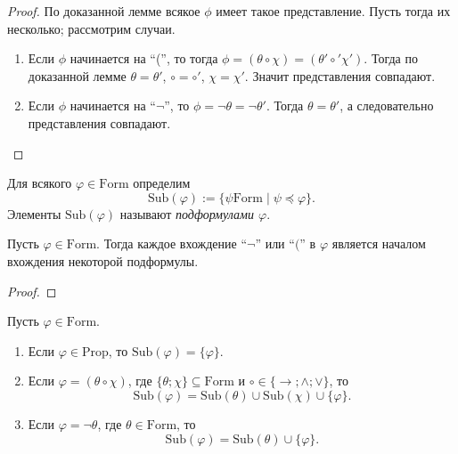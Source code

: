\documentclass[12pt,a4paper]{article}
\newcommand{\Prop}{\ensuremath{\mathrm{Prop}}\xspace}
\newcommand{\Formul}{\ensuremath{\mathrm{Form}}\xspace}
\newcommand{\Sub}{\ensuremath{\mathrm{Sub}}\xspace}
\begin{document}
    \begin{proof}
        По доказанной лемме всякое $\phi$ имеет такое представление. Пусть тогда их несколько; рассмотрим случаи.
        \begin{enumerate}
            \item Если $\phi$ начинается на ``('', то тогда $\phi = (\theta \circ \chi) = (\theta' \circ' \chi')$. Тогда по доказанной лемме $\theta = \theta'$, $\circ = \circ'$, $\chi = \chi'$. Значит представления совпадают.
            \item Если $\phi$ начинается на ``$\neg$'', то $\phi = \neg \theta = \neg \theta'$. Тогда $\theta = \theta'$, а следовательно представления совпадают.
        \end{enumerate}
    \end{proof}

    \begin{definition}
        Для всякого $\varphi \in \Formul$ определим
        \[\Sub(\varphi) := \{\psi \Formul \mid \psi \preccurlyeq \varphi\}.\]
        Элементы $\Sub(\varphi)$ называют \emph{подформулами $\varphi$}.
    \end{definition}

    \begin{lemma}
        Пусть $\varphi \in \Formul$. Тогда каждое вхождение ``$\neg$'' или ``$($'' в $\varphi$ является началом вхождения некоторой подформулы.
    \end{lemma}

    \begin{proof}
    \end{proof}

    \begin{theorem}
        Пусть $\varphi \in \Formul$.
        \begin{enumerate}
            \item Если $\varphi \in \Prop$, то $\Sub(\varphi) = \{\varphi\}$.
            \item Если $\varphi = (\theta \circ \chi)$, где $\{\theta; \chi\} \subseteq \Formul$ и $\circ \in \{\rightarrow; \wedge; \vee\}$, то
                \[\Sub(\varphi) = \Sub(\theta) \cup \Sub(\chi) \cup \{\varphi\}.\]
            \item Если $\varphi = \neg \theta$, где $\theta \in \Formul$, то
                \[\Sub(\varphi) = \Sub(\theta) \cup \{\varphi\}.\]
        \end{enumerate}
    \end{theorem}
\end{document}
